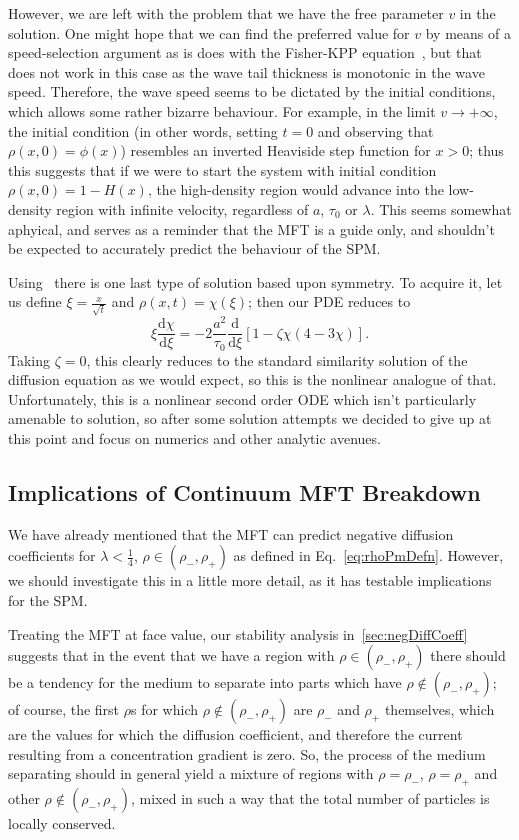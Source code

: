 However, we are left with the problem that we have the free parameter $v$ in the solution. One might hope that we can find the preferred value for $v$ by means of a speed-selection argument as is does with the Fisher-KPP
equation~\cite{sherrat1998}, but that does not work in this case as the wave tail thickness is monotonic in the wave speed. Therefore, the wave speed seems to be dictated by the initial conditions, which allows some rather bizarre
behaviour. For example, in the limit $v \rightarrow +\infty$, the initial condition (in other words, setting $t=0$ and observing that $\rho(x, 0) = \phi(x)$) resembles an inverted Heaviside step function for $x>0$; thus this
suggests that if we were to start the system with initial condition $\rho(x, 0) = 1 - H(x)$, the high-density region would advance into the low-density region with infinite velocity, regardless of $a$, $\tau_0$ or $\lambda$.
This seems somewhat aphyical, and serves as a reminder that the MFT is a guide only, and shouldn't be expected to accurately predict the behaviour of the SPM.

Using~\cite{ivanova2007} there is one last type of solution based upon symmetry. To acquire it, let us define $\xi = \frac{x}{\sqrt{t}}$ and $\rho(x, t) = \chi(\xi)$; then our PDE reduces to
\begin{equation}
 \xi \frac{\mathrm{d}\chi}{\mathrm{d}\xi} = -2\frac{a^2}{\tau_0} \frac{\mathrm{d}}{\mathrm{d}\xi}\left[ 1-\zeta \chi \left(4-3\chi\right) \right].
\end{equation}
Taking $\zeta=0$, this clearly reduces to the standard similarity solution of the diffusion equation as we would expect, so this is the nonlinear analogue of that. Unfortunately, this is a nonlinear second order ODE
which isn't particularly amenable to solution, so after some solution attempts we decided to give up at this point and focus on numerics and other analytic avenues.



\subsection{Implications of Continuum MFT Breakdown}
We have already mentioned that the MFT can predict negative diffusion coefficients for $\lambda<\frac{1}{4}$, $\rho \in (\rho_-, \rho_+)$ as defined in Eq.~\ref{eq:rhoPmDefn}. However, we should investigate this in a little
more detail, as it has testable implications for the SPM.

Treating the MFT at face value, our stability analysis in~\ref{sec:negDiffCoeff} suggests that in the event that we have a region with $\rho \in (\rho_-, \rho_+)$ there should be a tendency for the medium to separate into parts which
have $\rho \not\in (\rho_-, \rho_+)$; of course, the first $\rho$s for which $\rho \not\in (\rho_-, \rho_+)$ are $\rho_-$ and $\rho_+$ themselves, which are the values for which the diffusion coefficient, and therefore the current
resulting from a concentration gradient is zero. So, the process of the medium separating should in general yield a mixture of regions with $\rho = \rho_-$, $\rho = \rho_+$ and other $\rho \not\in (\rho_-, \rho_+)$, mixed in
such a way that the total number of particles is locally conserved.


